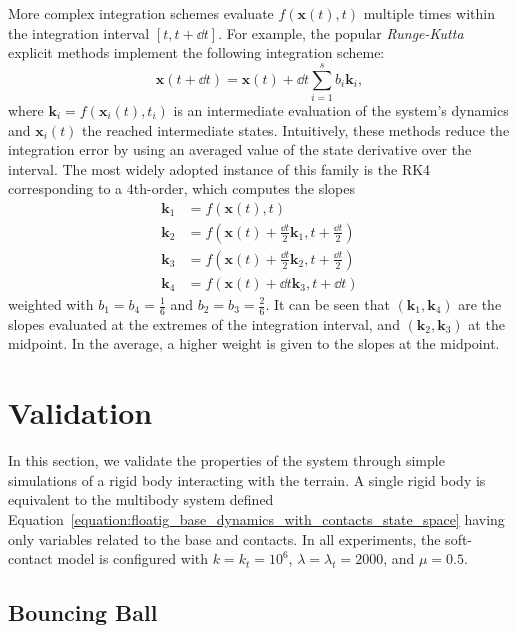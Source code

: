 More complex integration schemes evaluate $f\left(\mathbf{x}(t), t\right)$ multiple times within the integration interval $[t, t+\dd{t}]$.
For example, the popular \emph{Runge-Kutta} explicit methods implement the following integration scheme:
%
\begin{equation*}
    \mathbf{x}(t + \dd{t}) = \mathbf{x}(t) + \dd{t} \sum_{i=1}^{s} b_i \mathbf{k}_i
    ,
\end{equation*}
%
where $\mathbf{k}_i = f\left(\mathbf{x}_i(t), t_i\right)$ is an intermediate evaluation of the system's dynamics and $\mathbf{x}_i(t)$ the reached intermediate states.
Intuitively, these methods reduce the integration error by using an averaged value of the state derivative over the interval.
The most widely adopted instance of this family is the \ac{RK4} corresponding to a $4$th-order, which computes the slopes
%
\begin{align*}
    \mathbf{k}_1 &= f\left(\mathbf{x}(t), t\right) \\
    \mathbf{k}_2 &= f\left(\mathbf{x}(t) + \frac{\dd{t}}{2} \mathbf{k}_1, t + \frac{\dd{t}}{2}\right) \\
    \mathbf{k}_3 &= f\left(\mathbf{x}(t) + \frac{\dd{t}}{2} \mathbf{k}_2, t + \frac{\dd{t}}{2}\right) \\
    \mathbf{k}_4 &= f\left(\mathbf{x}(t) + \dd{t} \mathbf{k}_3, t + \dd{t}\right)
\end{align*}
%
weighted with $b_1 = b_4 = \frac{1}{6}$ and $b_2 = b_3 = \frac{2}{6}$.
It can be seen that $(\mathbf{k}_1, \mathbf{k}_4)$ are the slopes evaluated at the extremes of the integration interval, and $(\mathbf{k}_2, \mathbf{k}_3)$ at the midpoint.
In the average, a higher weight is given to the slopes at the midpoint.

\section{Validation}

In this section, we validate the properties of the system through simple simulations of a rigid body interacting with the terrain.
A single rigid body is equivalent to the multibody system defined Equation~\eqref{equation:floatig_base_dynamics_with_contacts_state_space} having only variables related to the base and contacts.
In all experiments, the soft-contact model is configured with $k = k_t = 10^6$, $\lambda = \lambda_t = 2000$, and $\mu=0.5$.

\subsection{Bouncing Ball}

